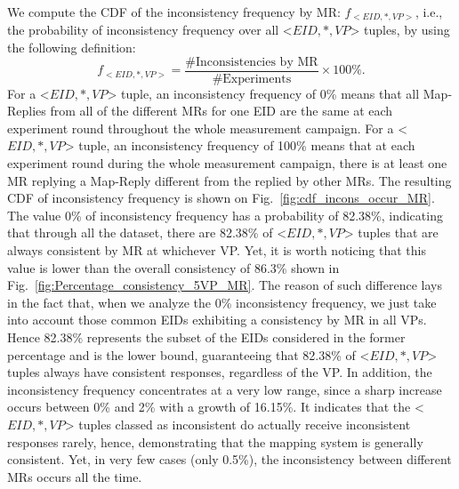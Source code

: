We compute the CDF of the inconsistency frequency by MR: $f_{<EID, *, VP>}$, i.e.,  the probability of inconsistency frequency over all <$EID, *, VP$> tuples, by using the following definition: 
\begin{equation}
f_{<EID, *, VP>}= \frac{\text{\# Inconsistencies by MR}}{\text{\# Experiments}}\times100\%.
\end{equation}
For a <$EID, *, VP$> tuple, an inconsistency frequency of 0\% means that all Map-Replies from all of the different MRs for one EID are the same at each experiment round throughout the whole measurement campaign.  For a <$EID, *, VP$> tuple, an inconsistency frequency of 100\% means that at each experiment round during the whole measurement campaign, there is at least one MR replying a Map-Reply different from the replied by other MRs. The resulting CDF of inconsistency frequency is shown on Fig.~\ref{fig:cdf_incons_occur_MR}. The value 0\% of inconsistency frequency has a probability of 82.38\%, indicating that through all the dataset, there are 82.38\% of <$EID, *, VP$> tuples that are always consistent by MR at whichever VP. Yet, it is worth noticing that this value is lower than the overall consistency of 86.3\% shown in Fig.~\ref{fig:Percentage_consistency_5VP_MR}. The reason of such difference lays in the fact that, when we analyze the 0\% inconsistency frequency, we just take into account those common EIDs exhibiting a consistency by MR in all VPs. Hence 82.38\% represents the subset of the EIDs considered in the former percentage and is the lower bound, guaranteeing that 82.38\% of <$EID, *, VP$> tuples always have consistent responses, regardless of the VP. In addition, the inconsistency frequency concentrates at a very low range, since a sharp increase occurs between 0\% and 2\% with a growth of 16.15\%. %
It indicates that the <$EID, *, VP$> tuples classed as inconsistent do actually receive inconsistent responses rarely, hence, demonstrating that the mapping system is generally consistent. Yet, in very few cases (only 0.5\%), the inconsistency between different MRs occurs all the time.


